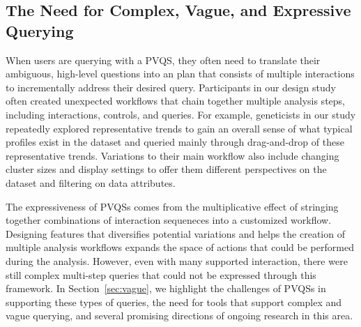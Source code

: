 \subsection{The Need for Complex, Vague, and Expressive Querying}
\par When users are querying with a PVQS, they often need to translate their ambiguous, high-level questions into an plan that consists of multiple interactions to incrementally address their desired query. Participants in our \zv design study often created unexpected workflows that chain together multiple analysis steps, including interactions, controls, and queries. For example, geneticists in our study repeatedly explored representative trends to gain an overall sense of what typical profiles exist in the dataset and queried mainly through drag-and-drop of these representative trends. Variations to their main workflow also include changing cluster sizes and display settings to offer them different perspectives on the dataset and filtering on data attributes. 
\par The expressiveness of PVQSs comes from the multiplicative effect of stringing together combinations of interaction sequeneces into a customized workflow. Designing features that diversifies potential variations and helps the creation of multiple analysis workflows expands the space of actions that could be performed during the analysis. However, even with many supported interaction, there were still complex multi-step queries that could not be expressed through this framework. In Section~\ref{sec:vague}, we highlight the challenges of PVQSs in supporting these types of queries, the need for tools that support complex and vague querying, and several promising directions of ongoing research in this area.
